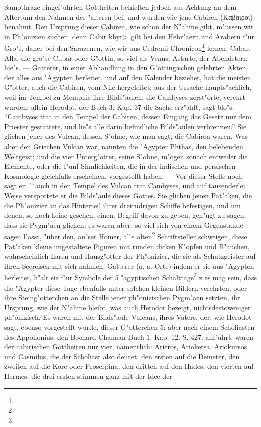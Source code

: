 \documentclass[a4paper, 11pt, oneside, polutonikogreek, german]{article}
\begin{document}
Samothraze eingef"uhrten Gottheiten behielten jedoch aus Achtung an dem Altertum den Nahmen der "alteren bei, und wurden wie jene Cabiren (Καβαιροι) benahmt. Den Ursprung dieser Cabiren, wie schon der N"ahme gibt, m"ussen wir in Ph"onizien suchen, denn Cabir \<kbyr> gilt bei den Hebr"aern und Arabern f"ur Gro"s, daher bei den Sarazenen, wie wir aus Cedrenii Chronicon\footnote{} lernen, Cabar, Alla, die gro"se Cubar oder G"ottin, so viel als Venus, Astarte, der Abendstern hie"s. --- Gatterer, in einer Abhandlung in den G"ottingischen gelehrten Akten, der alles aus "Agypten herleitet, und auf den Kalender beziehet, hat die meisten G"otter, auch die Cabiren, vom Nile hergeleitet; aus der Ursache haupts"achlich, weil im Tempel zu Memphis ihre Bilds"aulen, die Cambyses zerst"orte, verehrt wurden; allein Herodot, der Buch 3. Kap. 37 die Sache erz"ahlt, sagt blo"s: "`Cambyses trat in den Tempel der Cabiren, dessen Eingang das Gesetz nur dem Priester gestattete, und lie"s alle darin befindliche Bilds"aulen verbrennen."' Sie glichen jener des Vulcan, dessen S"ohne, wie man sagt, die Cabiren waren. Was aber den Griechen Vulcan war, nannten die "Agypter Phthas, den belebenden Weltgeist; und die vier Unterg"otter, seine S"ohne, m"ogen sonach entweder die Elemente, oder die f"unf Sinnlichkeiten, die in der indischen und persischen Kosmologie gleichfalls erscheinen, vorgestellt haben. --- Vor dieser Stelle noch sagt er: "`auch in den Tempel des Vulcan trat Cambyses, und auf tausenderlei Weise verspottete er die Bilds"aule dieses Gottes. Sie glichen jenen Pat"aken, die die Ph"onizier an das Hinterteil ihrer dreirudrigen Schiffe befestigen, und um denen, so noch keine gesehen, einen. Begriff davon zu geben, gen"ugt zu sagen, dass sie Pygm"aen glichen; es waren aber, so viel sich von einem Gegenstande sagen l"asst, "uber den, au"ser Homer, alle alten\footnote{} Schriftsteller schweigen, diese Pat"aken kleine ungestaltete Figuren mit runden dicken K"opfen und B"auchen, wahrscheinlich Laren und Hausg"otter der Ph"onizier, die sie als Schutzgeister auf ihren Seereisen mit sich nahmen. Gatterer (a. a. Orte) indem er sie aus "Agypten herleitet, h"alt sie f"ur Symbole der 5 "agyptischen Schalttage\footnote{} z es mag sein, dass die "Agypter diese Tage ebenfalls unter solchen kleinen Bildern verehrten, oder ihre Steing"otterchen an die Stelle jener ph"onizischen Pygm"aen setzten, ihr Ursprung, wie der N"ahme bleibt, was auch Herodot bezeigt, nichtsdestoweniger ph"onizisch. Es waren mit der Bilds"aule Vulcans, ihres Vaters, der, wie Herodot sagt, ebenso vorgestellt wurde, dieser G"otterchen 5; aber nach einem Scholiasten des Appollonius, den Bochard Chanaan Buch 1. Kap. 12. S. 427. anf"uhrt, waren der cabirischen Gottheiten nur vier, namentlich: Arieros, Ariokersa, Ariokursos und Casmilus, die der Scholiast also deutet: den ersten auf die Demeter, den zweiten auf die Kore oder Proserpina, den dritten auf den Hades, den vierten auf Hermes; die drei ersten stimmen ganz mit der Idee der 
\end{document}
